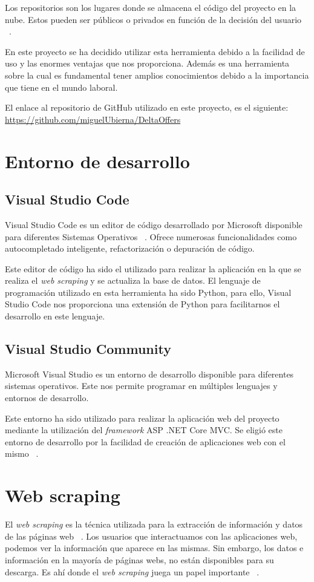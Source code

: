 Los repositorios son los lugares donde se almacena el código del proyecto en la nube. Estos pueden ser públicos o privados en función de la decisión del usuario ~\cite{github:latex}.

En este proyecto se ha decidido utilizar esta herramienta debido a la facilidad de uso y las enormes ventajas que nos proporciona. Además es una herramienta sobre la cual es fundamental tener amplios conocimientos debido a la importancia que tiene en el mundo laboral.

El enlace al repositorio de GitHub utilizado en este proyecto, es el siguiente: \href{https://github.com/miguelUbierna/DeltaOffers}{https://github.com/miguelUbierna/DeltaOffers}
\section{Entorno de desarrollo}

\subsection{Visual Studio Code}
Visual Studio Code es un editor de código desarrollado por Microsoft disponible para diferentes Sistemas Operativos ~\cite{vscode:latex}. Ofrece numerosas funcionalidades como autocompletado inteligente, refactorización o depuración de código.

Este editor de código ha sido el utilizado para realizar la aplicación en la que se realiza el \textit{web scraping} y se actualiza la base de datos. El lenguaje de programación utilizado en esta herramienta ha sido Python, para ello, Visual Studio Code nos proporciona una extensión de Python para facilitarnos el desarrollo en este lenguaje.

\subsection{Visual Studio Community}
Microsoft Visual Studio es un entorno de desarrollo disponible para diferentes sistemas operativos. Este nos permite programar en múltiples lenguajes y entornos de desarrollo.

Este entorno ha sido utilizado para realizar la aplicación web del proyecto mediante la utilización del \textit{framework} ASP .NET Core MVC. Se eligió este entorno de desarrollo por la facilidad de creación de aplicaciones web con el mismo ~\cite{vscommunity:latex}.

\section{Web scraping}
El \textit{web scraping} es la técnica utilizada para la extracción de información y datos de las páginas web ~\cite{webscrapingwiki:latex}. Los usuarios que interactuamos con las aplicaciones web, podemos ver la información que aparece en las mismas. Sin embargo, los datos e información en la mayoría de páginas webs, no están disponibles para su descarga. Es ahí donde el \textit{web scraping} juega un papel importante ~\cite{webscraping:latex}.

